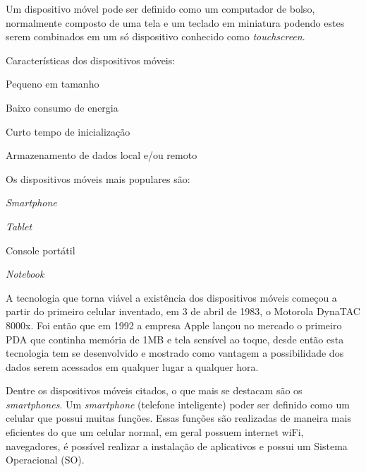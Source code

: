 Um dispositivo móvel pode ser definido como um computador de bolso, normalmente composto de uma tela e um teclado em miniatura podendo estes serem combinados em um só dispositivo conhecido como \textit{ touchscreen}.

Características dos dispositivos móveis:

\begin{alineascomponto}
 
\item Pequeno em tamanho
\item Baixo consumo de energia
\item Curto tempo de inicialização
\item Armazenamento de dados local e/ou remoto

	\end{alineascomponto}


Os dispositivos móveis mais populares são:

\begin{alineascomponto}
 
\item \textit{Smartphone}
\item \textit {Tablet}
\item Console portátil
\item \textit {Notebook}

	\end{alineascomponto}
	\cite{mov}

A tecnologia que torna viável a existência dos dispositivos móveis começou a partir do primeiro celular inventado, em 3 de abril de 1983, o Motorola DynaTAC 8000x. Foi então que em 1992 a empresa Apple lançou no mercado o primeiro PDA que continha memória de 1MB e tela sensível ao toque, desde então esta tecnologia tem se desenvolvido e mostrado como vantagem  a possibilidade dos dados serem acessados em qualquer lugar a qualquer hora. \cite{1cel}

Dentre os dispositivos móveis citados, o que mais se destacam são os \textit{smartphones}. Um \textit{smartphone} (telefone inteligente) poder ser definido como um celular que possui muitas funções. Essas funções são realizadas de maneira mais eficientes do que um celular normal, em geral possuem internet wiFi, navegadores, é possível realizar a instalação de aplicativos e possui um Sistema Operacional (SO). \cite{smar} 


